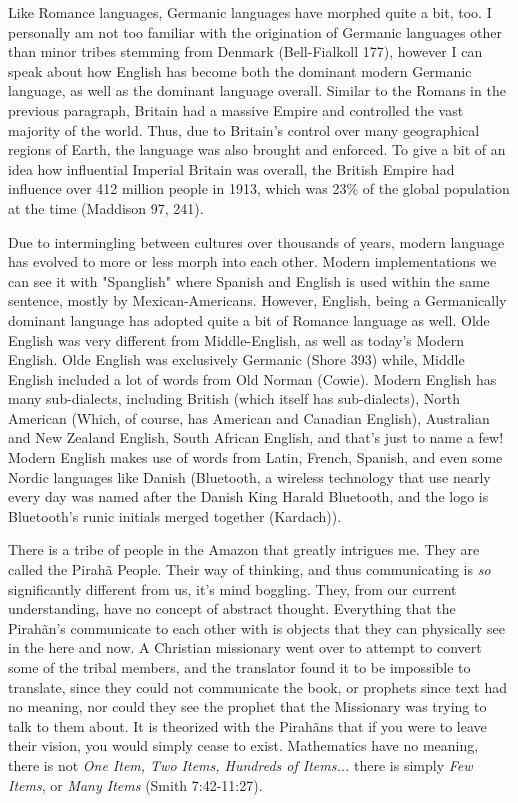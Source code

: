 \documentclass[12pt]{article}
\begin{document}
\par
Like Romance languages, Germanic languages have morphed quite a bit, too. I personally am not too familiar with the origination of Germanic languages other than minor tribes stemming from Denmark (Bell-Fialkoll 177), however I can speak about how English has become both the dominant modern Germanic language, as well as the dominant language overall. Similar to the Romans in the previous paragraph, Britain had a massive Empire and controlled the vast majority of the world. Thus, due to Britain's control over many geographical regions of Earth, the language was also brought and enforced. To give a bit of an idea how influential Imperial Britain was overall, the British Empire had influence over 412 million people in 1913, which was 23\% of the global population at the time (Maddison 97, 241).
\par
Due to intermingling between cultures over thousands of years, modern language has evolved to more or less morph into each other. Modern implementations we can see it with "Spanglish" where Spanish and English is used within the same sentence, mostly by Mexican-Americans. However, English, being a Germanically dominant language has adopted quite a bit of Romance language as well. Olde English was very different from Middle-English, as well as today's Modern English. Olde English was exclusively Germanic (Shore 393) while, Middle English included a lot of words from Old Norman (Cowie). Modern English has many sub-dialects, including British (which itself has sub-dialects), North American (Which, of course, has American and Canadian English), Australian and New Zealand English, South African English, and that's just to name a few! Modern English makes use of words from Latin, French, Spanish, and even some Nordic languages like Danish (Bluetooth, a wireless technology that use nearly every day was named after the Danish King Harald Bluetooth, and the logo is Bluetooth's runic initials merged together (Kardach)).
\par
There is a tribe of people in the Amazon that greatly intrigues me. They are called the Pirah\~{a} People. Their way of thinking, and thus communicating is \emph{so} significantly different from us, it's mind boggling. They, from our current understanding, have no concept of abstract thought. Everything that the Pirah\~{a}n's communicate to each other with is objects that they can physically see in the here and now. A Christian missionary went over to attempt to convert some of the tribal members, and the translator found it to be impossible to translate, since they could not communicate the book, or prophets since text had no meaning, nor could they see the prophet that the Missionary was trying to talk to them about. It is theorized with the Pirah\~{a}ns that if you were to leave their vision, you would simply cease to exist. Mathematics have no meaning, there is not \emph{One Item, Two Items, Hundreds of Items...} there is simply \emph{Few Items}, or \emph{Many Items} (Smith 7:42-11:27).
\par
\end{document}
